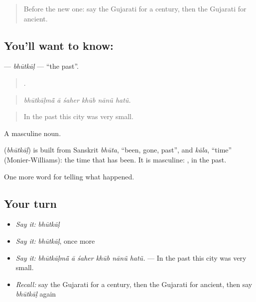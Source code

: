 \label{lesson:GU-C317-bhutkal}



\begin{quote}
Before the new one: say the Gujarati for a century, then the Gujarati for ancient.
\end{quote}

\subsection*{You'll want to know: }
\textbf{} — \emph{bhūtkāḷ} — \textquotedblleft{}the past\textquotedblright{}.

\begin{quote}
     .
\end{quote}

\begin{quote}
\emph{bhūtkāḷmā̃ ā śaher khūb nānũ hatũ.}
\end{quote}

\begin{quote}
In the past this city was very small.
\end{quote}

A masculine noun.

\begin{cousinweb}
\textbf{} (\emph{bhūtkāḷ}) is built from Sanskrit \emph{bhūta}, \textquotedblleft{}been, gone, past\textquotedblright{}, and \emph{kāla}, \textquotedblleft{}time\textquotedblright{} (Monier-Williams): the time that has been. It is masculine: \textbf{}, in the past.
\end{cousinweb}

\begin{grammarlens}[title={What you've built}]
One more word for telling what happened.
\end{grammarlens}

\subsection*{Your turn}
\begin{itemize}
\raggedright
  \item \emph{Say it:} \emph{bhūtkāḷ}
  \item \emph{Say it:} \emph{bhūtkāḷ}, once more
  \item \emph{Say it:} \emph{bhūtkāḷmā̃ ā śaher khūb nānũ hatũ.} — In the past this city was very small.
  \item \emph{Recall:} say the Gujarati for a century, then the Gujarati for ancient, then say \emph{bhūtkāḷ} again
\end{itemize}

